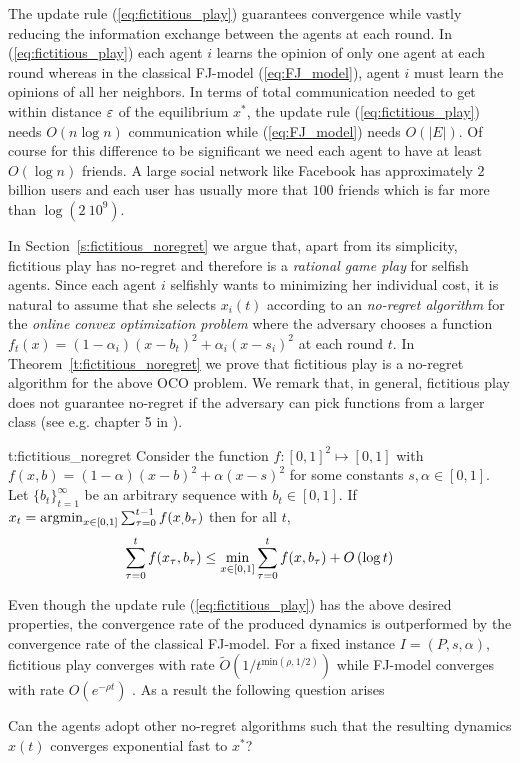 The update rule (\ref{eq:fictitious_play}) guarantees convergence
while vastly reducing the information exchange between the agents
at each round. In (\ref{eq:fictitious_play}) each agent $i$ learns the opinion of only one agent
at each round whereas in the classical FJ-model (\ref{eq:FJ_model}), agent $i$ must
learn the opinions of all her neighbors. In terms of
total communication needed to get within distance $\varepsilon$ of the
equilibrium $x^*$, the update rule (\ref{eq:fictitious_play}) needs
$O(n \log n)$ communication while (\ref{eq:FJ_model}) needs
$O(|E|)$. Of course for this difference to be significant we need
each agent to have at least $O(\log n)$ friends. A large social
network like Facebook has approximately $2$ billion users and each user
has usually more that $100$ friends which is far more than $\log(2\ 10^9)$.

In Section~\ref{s:fictitious_noregret} we argue that, 
apart from its simplicity, fictitious play has no-regret
and therefore is a \emph{rational game play} for selfish agents.
Since each agent $i$ selfishly wants to minimizing her individual cost,
it is natural to assume that she selects $x_i(t)$ according to
an \emph{no-regret algorithm} for the \emph{online convex optimization problem}
where the adversary chooses a function $f_t(x)=(1-\alpha_i)(x-b_t)^2 + \alpha_i(x-s_i)^2$
at each round $t$. In Theorem~\ref{t:fictitious_noregret} 
we prove that fictitious play is a no-regret algorithm 
for the above OCO problem. We remark that, in general,
fictitious play does not guarantee no-regret if the adversary can pick
functions from a larger class (see e.g. chapter 5 in \cite{Haz16}).

\begin{reptheorem}{t:fictitious_noregret}
  Consider the function $f:[0,1]^2 \mapsto [0,1]$ with
  $f(x,b) = (1-\alpha)(x-b)^2 + \alpha(x-s)^2$ for some
  constants $s,\alpha \in [0,1]$.
  Let $\{b_t\}_{t=1}^\infty$ be an arbitrary sequence with
  $b_t \in [0,1]$. If $x_t = \operatorname*{argmin}_{x \in [0,1]}\sum_{\tau=0}^{t-1}f(x_,b_\tau)$
  then for all $t$,
  \[
    \sum_{\tau=0}^{t}f(x_\tau,b_\tau) \leq
    \min_{x \in [0,1]}\sum_{\tau=0}^tf(x,b_\tau) + O\left(\log t\right)
  \]
\end{reptheorem}

Even though the update rule (\ref{eq:fictitious_play}) has the above
desired properties, the convergence rate of the produced dynamics is
outperformed by the convergence rate of the classical FJ-model. For
a fixed instance $I=(P,s,\alpha)$, fictitious play converges with rate
$\widetilde{O}(1/t^{\text{min}(\rho,1/2)})$ while FJ-model
converges with rate $O(e^{-\rho t})$ \cite{GS14}.
As a result the following question arises
\begin{question}
  Can the agents adopt other no-regret algorithms such that the resulting
  dynamics $x(t)$ converges exponential fast to $x^*$?
\end{question}

